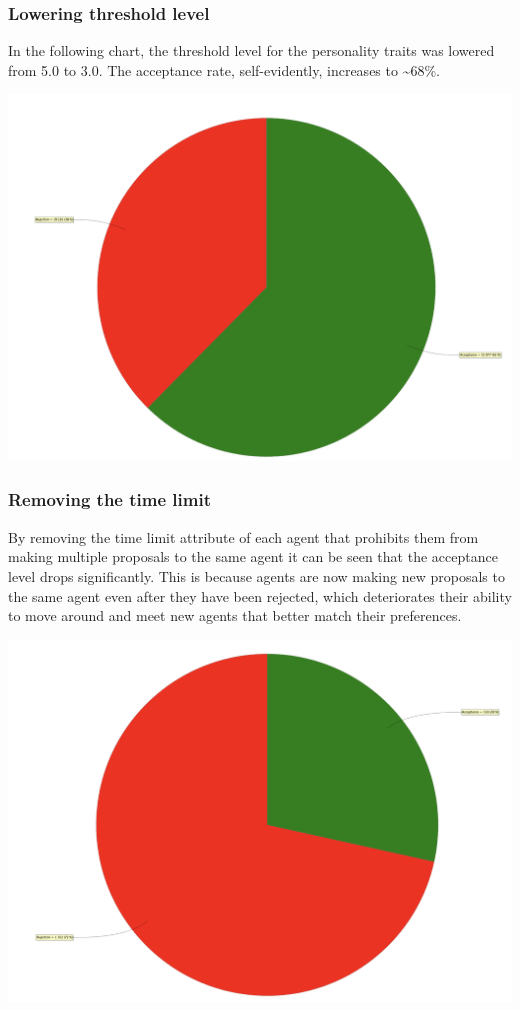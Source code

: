 \documentclass[a4paper,10pt]{article}
\begin{document}
\subsubsection{Lowering threshold level}
In the following chart, the threshold level for the personality traits was lowered from 5.0 to 3.0. The acceptance rate, self-evidently, increases to \textasciitilde 68\%.

\begin{center}{}
\centering\includegraphics[scale=0.05]{lowerthreshold.png}\par
\end{center}

\subsubsection{Removing the time limit}
By removing the time limit attribute of each agent that prohibits them from making multiple proposals to the same agent it can be seen that the acceptance level drops significantly. This is because agents are now making new proposals to the same agent even after they have been rejected, which deteriorates their ability to move around and meet new agents that better match their preferences.

\begin{center}{}
\centering\includegraphics[scale=0.05]{notimelimit.png}\par
\end{center}
\end{document}
